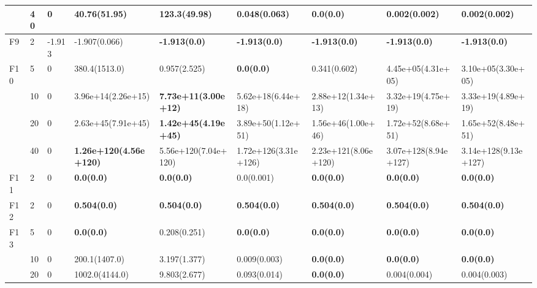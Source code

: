 \begin{longtable}{|l|l|l|l|l|l|l|l|l|}
\cmidrule{2-9} & 40  & 0        & 40.76(51.95)                  & 123.3(49.98)                & 0.048(0.063)            & \textbf{0.0(0.0)}         & 0.002(0.002)           & 0.002(0.002)          \\ \hline
F9             & 2   & -1.913   & -1.907(0.066)                 & \textbf{-1.913(0.0)}        & \textbf{-1.913(0.0)}    & \textbf{-1.913(0.0)}      & \textbf{-1.913(0.0)}   & \textbf{-1.913(0.0)}  \\ \hline
F10            & 5   & 0        & 380.4(1513.0)                 & 0.957(2.525)                & \textbf{0.0(0.0)}       & 0.341(0.602)              & 4.45e+05(4.31e+05)     & 3.10e+05(3.30e+05)    \\
\cmidrule{2-9} & 10  & 0        & 3.96e+14(2.26e+15)            & \textbf{7.73e+11(3.00e+12)} & 5.62e+18(6.44e+18)      & 2.88e+12(1.34e+13)        & 3.32e+19(4.75e+19)     & 3.33e+19(4.89e+19)    \\
\cmidrule{2-9} & 20  & 0        & 2.63e+45(7.91e+45)            & \textbf{1.42e+45(4.19e+45)} & 3.89e+50(1.12e+51)      & 1.56e+46(1.00e+46)        & 1.72e+52(8.68e+51)     & 1.65e+52(8.48e+51)    \\
\cmidrule{2-9} & 40  & 0        & \textbf{1.26e+120(4.56e+120)} & 5.56e+120(7.04e+120)        & 1.72e+126(3.31e+126)    & 2.23e+121(8.06e+120)      & 3.07e+128(8.94e+127)   & 3.14e+128(9.13e+127)  \\ \hline
F11            & 2   & 0        & \textbf{0.0(0.0)}             & \textbf{0.0(0.0)}           & 0.0(0.001)              & \textbf{0.0(0.0)}         & \textbf{0.0(0.0)}      & \textbf{0.0(0.0)}     \\ \hline
F12            & 2   & 0        & \textbf{0.504(0.0)}           & \textbf{0.504(0.0)}         & \textbf{0.504(0.0)}     & \textbf{0.504(0.0)}       & \textbf{0.504(0.0)}    & \textbf{0.504(0.0)}   \\ \hline
F13            & 5   & 0        & \textbf{0.0(0.0)}             & 0.208(0.251)                & \textbf{0.0(0.0)}       & \textbf{0.0(0.0)}         & \textbf{0.0(0.0)}      & \textbf{0.0(0.0)}     \\
\cmidrule{2-9} & 10  & 0        & 200.1(1407.0)                 & 3.197(1.377)                & 0.009(0.003)            & \textbf{0.0(0.0)}         & \textbf{0.0(0.0)}      & \textbf{0.0(0.0)}     \\
\cmidrule{2-9} & 20  & 0        & 1002.0(4144.0)                & 9.803(2.677)                & 0.093(0.014)            & \textbf{0.0(0.0)}         & 0.004(0.004)           & 0.004(0.003)          \\

\end{longtable}
